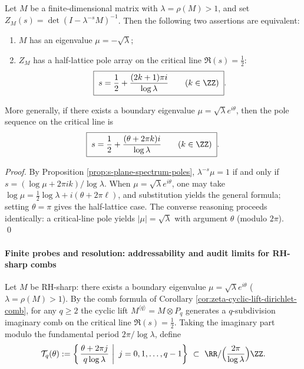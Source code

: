 \begin{corollary}\label{cor:zeta-signflip-half-lattice}
Let \(M\) be a finite-dimensional matrix with \(\lambda=\rho(M)>1\), and set \(Z_M(s)=\det(I-\lambda^{-s}M)^{-1}\).
Then the following two assertions are equivalent:
\begin{enumerate}
  \item \(M\) has an eigenvalue \(\mu=-\sqrt{\lambda}\);
  \item \(Z_M\) has a half-lattice pole array on the critical line \(\Re(s)=\tfrac12\):
  \[
  \boxed{\;
  s=\frac12+\frac{(2k+1)\pi i}{\log\lambda}\qquad(k\in\ZZ)\; }.
  \]
\end{enumerate}
More generally, if there exists a boundary eigenvalue \(\mu=\sqrt{\lambda}e^{i\theta}\), then the pole sequence on the critical line is
\[
\boxed{\;
s=\frac12+\frac{(\theta+2\pi k)i}{\log\lambda}\qquad(k\in\ZZ)\; }.
\]
\end{corollary}
\begin{proof}
By Proposition \ref{prop:s-plane-spectrum-poles}, \(\lambda^{-s}\mu=1\) if and only if
\(
s=(\log\mu+2\pi i k)/\log\lambda
\).
When \(\mu=\sqrt{\lambda}e^{i\theta}\), one may take \(\log\mu=\tfrac12\log\lambda+i(\theta+2\pi\ell)\), and substitution yields the general formula;
setting \(\theta=\pi\) gives the half-lattice case.
The converse reasoning proceeds identically: a critical-line pole yields \(|\mu|=\sqrt{\lambda}\) with argument \(\theta\) (modulo \(2\pi\)). \qed
\end{proof}

\paragraph{Finite probes and resolution: addressability and audit limits for RH-sharp combs}
Let \(M\) be RH-sharp: there exists a boundary eigenvalue \(\mu=\sqrt{\lambda}e^{i\theta}\) (\(\lambda=\rho(M)>1\)).
By the comb formula of Corollary \ref{cor:zeta-cyclic-lift-dirichlet-comb}, for any \(q\ge 2\) the cyclic lift
\(
M^{\langle q\rangle}=M\otimes P_q
\)
generates a \(q\)-subdivision imaginary comb on the critical line \(\Re(s)=\tfrac12\).
Taking the imaginary part modulo the fundamental period \(2\pi/\log\lambda\), define
\[
\mathcal T_q(\theta):=
\left\{\left.\frac{\theta+2\pi j}{q\log\lambda}\ \right|\ j=0,1,\dots,q-1\right\}
\ \subset\ \RR/\Bigl(\frac{2\pi}{\log\lambda}\Bigr)\ZZ .
\]

